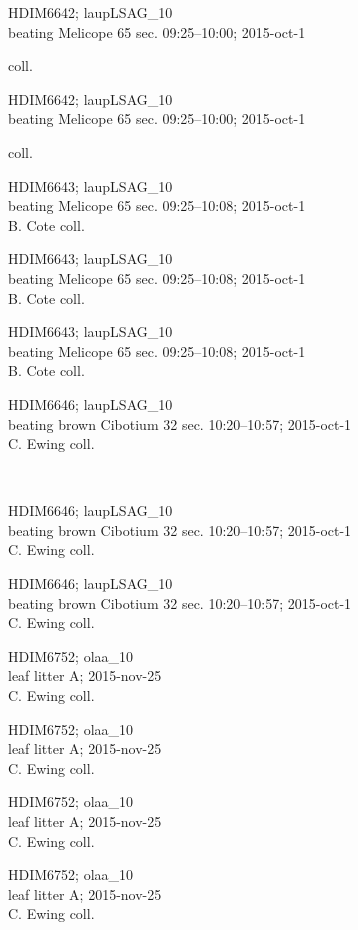 \documentclass[2pt]{extarticle}
\begin{document}
\noindent
\parbox{0.16\textwidth}{\tiny \raggedright \rule[-0.3\baselineskip]{0pt}{10pt}HDIM6642; laupLSAG\_10\\ beating Melicope 65 sec. 09:25--10:00; 2015-oct-1\\ \rule{0ex}{0ex}\hspace{6em} coll.}
\parbox{0.16\textwidth}{\tiny \raggedright \rule[-0.3\baselineskip]{0pt}{10pt}HDIM6642; laupLSAG\_10\\ beating Melicope 65 sec. 09:25--10:00; 2015-oct-1\\ \rule{0ex}{0ex}\hspace{6em} coll.}
\parbox{0.16\textwidth}{\tiny \raggedright \rule[-0.3\baselineskip]{0pt}{10pt}HDIM6643; laupLSAG\_10\\ beating Melicope 65 sec. 09:25--10:08; 2015-oct-1\\ B. Cote coll.}
\parbox{0.16\textwidth}{\tiny \raggedright \rule[-0.3\baselineskip]{0pt}{10pt}HDIM6643; laupLSAG\_10\\ beating Melicope 65 sec. 09:25--10:08; 2015-oct-1\\ B. Cote coll.}
\parbox{0.16\textwidth}{\tiny \raggedright \rule[-0.3\baselineskip]{0pt}{10pt}HDIM6643; laupLSAG\_10\\ beating Melicope 65 sec. 09:25--10:08; 2015-oct-1\\ B. Cote coll.}
\parbox{0.16\textwidth}{\tiny \raggedright \rule[-0.3\baselineskip]{0pt}{10pt}HDIM6646; laupLSAG\_10\\ beating brown Cibotium 32 sec. 10:20--10:57; 2015-oct-1\\ C. Ewing coll.} \\ 
\vspace{0.001in} 

\noindent
\parbox{0.16\textwidth}{\tiny \raggedright \rule[-0.3\baselineskip]{0pt}{10pt}HDIM6646; laupLSAG\_10\\ beating brown Cibotium 32 sec. 10:20--10:57; 2015-oct-1\\ C. Ewing coll.}
\parbox{0.16\textwidth}{\tiny \raggedright \rule[-0.3\baselineskip]{0pt}{10pt}HDIM6646; laupLSAG\_10\\ beating brown Cibotium 32 sec. 10:20--10:57; 2015-oct-1\\ C. Ewing coll.}
\parbox{0.16\textwidth}{\tiny \raggedright \rule[-0.3\baselineskip]{0pt}{10pt}HDIM6752; olaa\_10\\ leaf litter A; 2015-nov-25\\ C. Ewing coll.}
\parbox{0.16\textwidth}{\tiny \raggedright \rule[-0.3\baselineskip]{0pt}{10pt}HDIM6752; olaa\_10\\ leaf litter A; 2015-nov-25\\ C. Ewing coll.}
\parbox{0.16\textwidth}{\tiny \raggedright \rule[-0.3\baselineskip]{0pt}{10pt}HDIM6752; olaa\_10\\ leaf litter A; 2015-nov-25\\ C. Ewing coll.}
\parbox{0.16\textwidth}{\tiny \raggedright \rule[-0.3\baselineskip]{0pt}{10pt}HDIM6752; olaa\_10\\ leaf litter A; 2015-nov-25\\ C. Ewing coll.} \\ 
\vspace{0.001in} 
\end{document}
